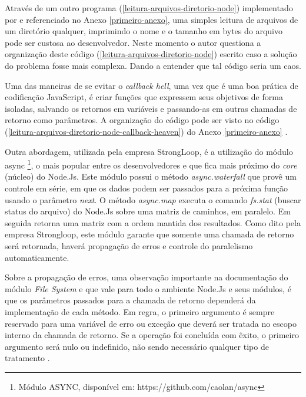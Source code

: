   Através de um outro programa (\ref{leitura-arquivos-diretorio-node}) implementado por  e referenciado no 
  Anexo \ref{primeiro-anexo}, uma simples leitura de arquivos de um diretório qualquer, imprimindo o nome e o tamanho em bytes do arquivo 
  pode ser custosa ao desenvolvedor. Neste momento o autor questiona a organização deste código (\ref{leitura-arquivos-diretorio-node}) escrito caso a solução do 
  problema fosse mais complexa. Dando a entender que tal código seria um caos.
  
  
  Uma das maneiras de se evitar o \textit{callback hell}, uma vez que é uma boa prática de codificação JavaScript, é
  criar funções que expressem seus objetivos de forma isoladas, salvando os retornos em variáveis e passando-as em outras
  chamadas de retorno como parâmetros. A organização do código pode ser visto no código (\ref{leitura-arquivos-diretorio-node-callback-heaven}) do
  Anexo \ref{primeiro-anexo} \cite{Pereira:2013}.
 
  Outra abordagem, utilizada pela empresa StrongLoop, é a utilização do módulo async \footnote{Módulo ASYNC, disponível em: https://github.com/caolan/async},
  o mais popular entre os desenvolvedores e que fica mais próximo do \textit{core} (núcleo) do Node.Js. Este módulo
  possui o método \textit{async.waterfall} que provê um controle em série, em que os dados podem ser passados para a próxima função
  usando o parâmetro \textit{next}. O método \textit{async.map} executa o comando \textit{fs.stat} (buscar status do arquivo) do Node.Js sobre uma matriz
  de caminhos, em paralelo. Em seguida retorna uma matriz com a ordem mantida dos resultados. Como dito pela empresa
  Strongloop, este módulo garante que somente uma chamada de retorno será retornada, haverá propagação de erros e controle do 
  paralelismo automaticamente. 
  
  Sobre a propagação de erros, uma observação importante na documentação do módulo \textit{File System} e que 
  vale para todo o ambiente Node.Js e seus módulos, é que os parâmetros passados para a chamada de retorno dependerá da 
  implementação de cada método. Em regra, o primeiro argumento é sempre reservado para uma variável de erro ou exceção 
  que deverá ser tratada no escopo interno da chamada de retorno. Se a operação foi concluída com êxito, o primeiro argumento 
  será nulo ou indefinido, não sendo necessário qualquer tipo de tratamento \cite{ModuleSystemFs:2014}.
  

